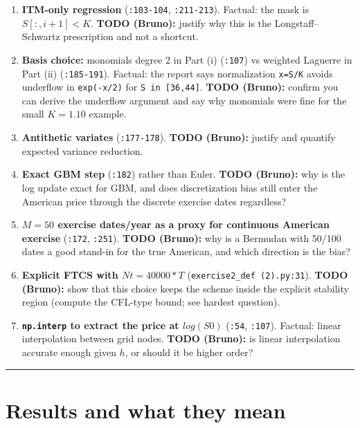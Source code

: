 \documentclass[
  11pt,
]{article}
\providecommand{\tightlist}{%
  \setlength{\itemsep}{0pt}\setlength{\parskip}{0pt}}
\begin{document}
\begin{enumerate}
\def\labelenumi{\arabic{enumi}.}
\tightlist
\item
  \textbf{ITM-only regression} (\texttt{:103-104}, \texttt{:211-213}).
  Factual: the mask is \(S[:,i+1] < K\). \textbf{TODO (Bruno):} justify
  why this is the Longstaff--Schwartz prescription and not a shortcut.
\item
  \textbf{Basis choice:} monomials degree 2 in Part (i) (\texttt{:107})
  vs weighted Laguerre in Part (ii) (\texttt{:185-191}). Factual: the
  report says normalization \texttt{x=S/K} avoids underflow in
  \texttt{exp(-x/2)} for \texttt{S\ in\ {[}36,44{]}}. \textbf{TODO
  (Bruno):} confirm you can derive the underflow argument and say why
  monomials were fine for the small \(K=1.10\) example.
\item
  \textbf{Antithetic variates} (\texttt{:177-178}). \textbf{TODO
  (Bruno):} justify and quantify expected variance reduction.
\item
  \textbf{Exact GBM step} (\texttt{:182}) rather than Euler.
  \textbf{TODO (Bruno):} why is the log update exact for GBM, and does
  discretization bias still enter the American price through the
  discrete exercise dates regardless?
\item
  \textbf{\(M = 50\) exercise dates/year as a proxy for continuous
  American exercise} (\texttt{:172}, \texttt{:251}). \textbf{TODO
  (Bruno):} why is a Bermudan with 50/100 dates a good stand-in for the
  true American, and which direction is the bias?
\item
  \textbf{Explicit FTCS with \(Nt = 40000*T\)}
  (\texttt{exercise2\_def\ (2).py:31}). \textbf{TODO (Bruno):} show that
  this choice keeps the scheme inside the explicit stability region
  (compute the CFL-type bound; see hardest question).
\item
  \textbf{\texttt{np.interp} to extract the price at \(log(S0)\)}
  (\texttt{:54}, \texttt{:107}). Factual: linear interpolation between
  grid nodes. \textbf{TODO (Bruno):} is linear interpolation accurate
  enough given \(h\), or should it be higher order?
\end{enumerate}

\begin{center}\rule{0.5\linewidth}{0.5pt}\end{center}

\hypertarget{results-and-what-they-mean}{%
\section{Results and what they mean}\label{results-and-what-they-mean}}
\end{document}
